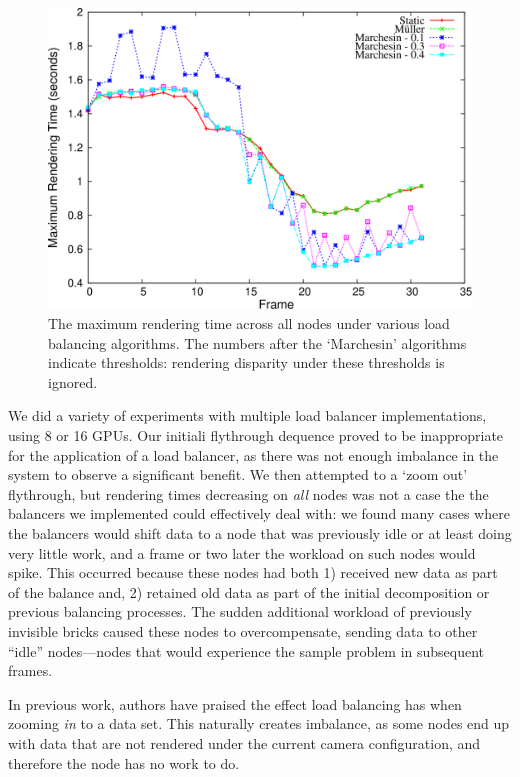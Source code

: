 \begin{figure}
  \includegraphics[width=\linewidth]{images/multiscale/balance}
  \caption{The maximum rendering time across all nodes under various
  load balancing algorithms.  The numbers after the `Marchesin'
  algorithms indicate thresholds: rendering disparity under these
  thresholds is ignored.}
  \label{fig:balance}
\end{figure}

We did a variety of experiments with multiple load balancer
implementations, using 8 or 16 GPUs.  Our initiali flythrough dequence
proved to be inappropriate for the application of a load balancer, as
there was not enough imbalance in the system to observe a significant
benefit.  We then attempted to
a `zoom out' flythrough, but rendering times decreasing on \emph{all}
nodes was not a case the the balancers we implemented could effectively
deal with: we found many cases where the balancers would shift data
to a node that was previously idle or at least doing very little
work, and a frame or two later the workload on such nodes would
spike.  This occurred because these nodes had both 1) received new
data as part of the balance and, 2) retained old data as part of the
initial decomposition or previous balancing processes.  The sudden
additional workload of previously invisible bricks caused these nodes
to overcompensate, sending data to other ``idle'' nodes---nodes that
would experience the sample problem in subsequent frames.

In previous work, authors have praised the effect load balancing has
when
zooming \emph{in} to a data set.  This naturally creates imbalance, as
some nodes end up with data that are not rendered under the current
camera configuration, and therefore the node has no work to do.

